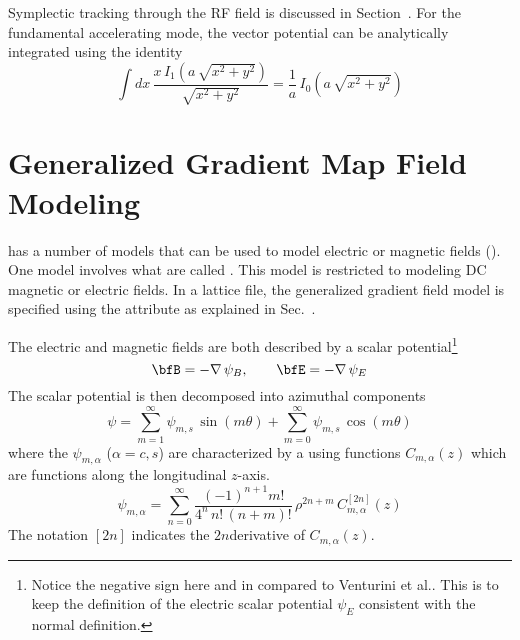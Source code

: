 Symplectic tracking through the RF field is discussed in Section~.  For the
fundamental accelerating mode, the vector potential can be analytically integrated using the
identity
\begin{equation}
  \int dx \,\frac{x \, I_1 (a \, \sqrt{x^2+y^2})}{\sqrt{x^2+y^2}}  = 
  \frac{1}{a} \, I_0 (a \, \sqrt{x^2+y^2})
\end{equation}

\section{Generalized Gradient Map Field Modeling}
\label{s:gen.grad.phys}

\bmad has a number of  models that can be used to model electric or magnetic fields
(). One model involves what are called \cite{b:gen.grad}.
This model is restricted to modeling DC magnetic or electric fields. In a lattice file, the
generalized gradient field model is specified using the  attribute as explained
in Sec.~.

The electric and magnetic fields are both described by a scalar potential\footnote
  {
Notice the negative sign here and in  compared to Venturini et al.\cite{b:gen.grad}. This
is to keep the definition of the electric scalar potential $\psi_E$ consistent with the normal
definition.
  }
\begin{equation}
  \bfB = -\nabla \, \psi_B, \qquad \bfE = -\nabla \, \psi_E
  \label{bpep2}
\end{equation}
The scalar potential is then decomposed into azimuthal components
\begin{equation}
  \psi = \sum_{m = 1}^\infty \psi_{m,s} \, \sin(m \theta) + \sum_{m = 0}^\infty \psi_{m,s} \, \cos(m \theta)
\end{equation}
where the $\psi_{m,\alpha}$ ($\alpha = c,s$) are characterized by a using functions
$C_{m,\alpha}(z)$ which are functions along the longitudinal $z$-axis.
\begin{equation}
  \psi_{m,\alpha} = \sum_{n = 0}^\infty \frac{(-1)^{n+1} m!}{4^n \, n! \, (n+m)!} 
  \, \rho^{2n+m} \, C_{m,\alpha}^{[2n]}(z) 
  \label{ppmpp}
\end{equation}
The notation $[2n]$ indicates the $2n$\Th derivative of $C_{m,\alpha}(z)$.

